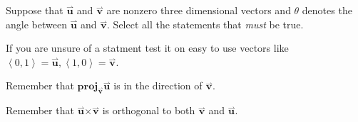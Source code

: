 \documentclass{ximera}
\author{Jim Talamo}
\begin{document}
\begin{exercise}
Suppose that $\overset{\boldsymbol{\rightharpoonup}}{\mathbf{u}}$ and $\overset{\boldsymbol{\rightharpoonup}}{\mathbf{v}}$ are nonzero three dimensional
vectors and $\theta$ denotes the angle between $\overset{\boldsymbol{\rightharpoonup}}{\mathbf{u}}$ and $\overset{\boldsymbol{\rightharpoonup}}{\mathbf{v}}$. Select all the statements that \emph{must} be true.

\begin{selectAll}
\end{selectAll}

\begin{hint}
If you are unsure of a statment test it on easy to use vectors like $\left< 0,1 \right> =\overset{\boldsymbol{\rightharpoonup}}{\mathbf{u}} , \left< 1,0 \right> = \overset{\boldsymbol{\rightharpoonup}}{\mathbf{v}}$.
\end{hint}

\begin{hint}
Remember that $\mathbf{proj}_{\overset{\boldsymbol{\rightharpoonup}}{\mathbf{v}}} \overset{\boldsymbol{\rightharpoonup}}{\mathbf{u}}$ is in the direction of $\overset{\boldsymbol{\rightharpoonup}}{\mathbf{v}}$.
\end{hint}

\begin{hint}
Remember that $\overset{\boldsymbol{\rightharpoonup}}{\mathbf{u}} \boldsymbol\times \overset{\boldsymbol{\rightharpoonup}}{\mathbf{v}}$ is orthogonal to both $\overset{\boldsymbol{\rightharpoonup}}{\mathbf{v}}$ and $\overset{\boldsymbol{\rightharpoonup}}{\mathbf{u}}$.
\end{hint}

\end{exercise}
\end{document}

